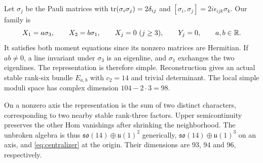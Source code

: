 Let $\sigma_j$ be the Pauli matrices with
$\operatorname{tr}(\sigma_i\sigma_j)=2\delta_{ij}$ and
$[\sigma_i,\sigma_j]=2i\epsilon_{ijk}\sigma_k$. Our family is
\begin{equation}\label{eq:pauli}
 X_1=a\sigma_3,\qquad X_2=b\sigma_1,\qquad
 X_j=0\ (j\ge3),\qquad Y_j=0,\qquad a,b\in\mathbb R.
\end{equation}
It satisfies both moment equations since its nonzero matrices are
Hermitian. If $ab\ne0$, a line invariant under $\sigma_3$ is an
eigenline, and $\sigma_1$ exchanges the two eigenlines. The
representation is therefore simple. Reconstruction gives an actual
stable rank-six bundle $E_{a,b}$ with $c_2=14$ and trivial determinant.
The local simple moduli space has complex dimension
$104-2\cdot3=98$.

On a nonzero axis the representation is the sum of two distinct
characters, corresponding to two nearby stable rank-three factors.
Upper semicontinuity preserves the other Hom vanishings after
shrinking the neighborhood. The unbroken algebra is thus
$\mathfrak{so}(14)\oplus\mathfrak u(1)^2$ generically,
$\mathfrak{so}(14)\oplus\mathfrak u(1)^3$ on an axis, and
\eqref{eq:centralizer} at the origin. Their dimensions are
93, 94 and 96, respectively.
